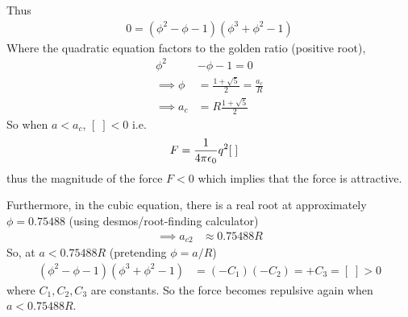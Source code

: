\documentclass[../main.tex]{subfiles}
\begin{document}
\begin{center}
\end{center}
Thus
\begin{align*}
    0 = (\phi^2 - \phi - 1)(\phi^3 + \phi^2 - 1)
\end{align*}
Where the quadratic equation factors to the golden ratio (positive root),
\begin{align*}
    \phi^2 &- \phi - 1 = 0 \\
    \implies \phi &= \frac{1 + \sqrt{5}}{2} = \frac{a_c}{R} \\
    \implies a_c &= R \frac{1 + \sqrt{5}}{2}
\end{align*}
So when $a < a_c$, $[\;] < 0$ i.e.
\begin{align*}
    F &= \ke q^2 \qt[\;]
\end{align*} 
thus the magnitude of the force $F < 0$ which implies
that the force is attractive.

Furthermore, in the cubic equation, there is a real root at approximately $\phi = 0.75488$ (using desmos/root-finding calculator)
\begin{align*}
    \implies a_{c2} &\approx 0.75488 R
\end{align*}
So, at $a < 0.75488 R$ (pretending $\phi = a / R$)
\begin{align*}
    (\phi^2 - \phi - 1)(\phi^3 + \phi^2 - 1) &= (-C_1)(-C_2) = + C_3 = [\;] > 0
\end{align*}
where $C_1, C_2, C_3$ are constants. So the force becomes repulsive again when $a < 0.75488 R$.

\newpage
\end{document}
